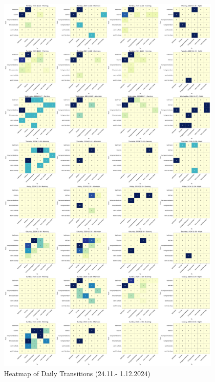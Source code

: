 \documentclass[A4,10pt]{article}
\begin{document}
\begin{figure}[H]
	\centering
	\begin{minipage}{0.45\textwidth}
		\centering
		\includegraphics[width=\textwidth]{heatmap_days1.pdf}
		\caption{Heatmap of Daily Transitions (24.11.- 1.12.2024)}
		\label{fig:heatmap1}
	\end{minipage}\hspace{0.04\textwidth}
	\begin{minipage}{0.45\textwidth}
		\centering

\end{minipage}
\end{figure}
\end{document}
